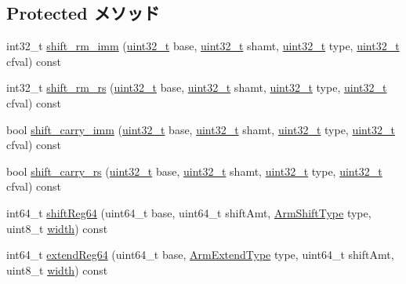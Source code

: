 \subsection*{Protected メソッド}
\begin{DoxyCompactItemize}
\item 
int32\_\-t \hyperlink{classArmISA_1_1ArmStaticInst_a3bf2cda24ceeea2d93bb03f88ddeec19}{shift\_\-rm\_\-imm} (\hyperlink{Type_8hh_a435d1572bf3f880d55459d9805097f62}{uint32\_\-t} base, \hyperlink{Type_8hh_a435d1572bf3f880d55459d9805097f62}{uint32\_\-t} shamt, \hyperlink{Type_8hh_a435d1572bf3f880d55459d9805097f62}{uint32\_\-t} type, \hyperlink{Type_8hh_a435d1572bf3f880d55459d9805097f62}{uint32\_\-t} cfval) const 
\item 
int32\_\-t \hyperlink{classArmISA_1_1ArmStaticInst_a9c90a343b88f159bcb263bd2457848a5}{shift\_\-rm\_\-rs} (\hyperlink{Type_8hh_a435d1572bf3f880d55459d9805097f62}{uint32\_\-t} base, \hyperlink{Type_8hh_a435d1572bf3f880d55459d9805097f62}{uint32\_\-t} shamt, \hyperlink{Type_8hh_a435d1572bf3f880d55459d9805097f62}{uint32\_\-t} type, \hyperlink{Type_8hh_a435d1572bf3f880d55459d9805097f62}{uint32\_\-t} cfval) const 
\item 
bool \hyperlink{classArmISA_1_1ArmStaticInst_a0d5e73a81869e11788298814fcdbc6d5}{shift\_\-carry\_\-imm} (\hyperlink{Type_8hh_a435d1572bf3f880d55459d9805097f62}{uint32\_\-t} base, \hyperlink{Type_8hh_a435d1572bf3f880d55459d9805097f62}{uint32\_\-t} shamt, \hyperlink{Type_8hh_a435d1572bf3f880d55459d9805097f62}{uint32\_\-t} type, \hyperlink{Type_8hh_a435d1572bf3f880d55459d9805097f62}{uint32\_\-t} cfval) const 
\item 
bool \hyperlink{classArmISA_1_1ArmStaticInst_a75fefade18d7fe86d23af0c7944eab6b}{shift\_\-carry\_\-rs} (\hyperlink{Type_8hh_a435d1572bf3f880d55459d9805097f62}{uint32\_\-t} base, \hyperlink{Type_8hh_a435d1572bf3f880d55459d9805097f62}{uint32\_\-t} shamt, \hyperlink{Type_8hh_a435d1572bf3f880d55459d9805097f62}{uint32\_\-t} type, \hyperlink{Type_8hh_a435d1572bf3f880d55459d9805097f62}{uint32\_\-t} cfval) const 
\item 
int64\_\-t \hyperlink{classArmISA_1_1ArmStaticInst_ab15bd99705b24d9b8d647aba628ee562}{shiftReg64} (uint64\_\-t base, uint64\_\-t shiftAmt, \hyperlink{namespaceArmISA_a209d79feaaef0aa2f54ae62e53ee90de}{ArmShiftType} type, uint8\_\-t \hyperlink{namespaceArmISA_a0da89c280130b84ae26405a901396428}{width}) const 
\item 
int64\_\-t \hyperlink{classArmISA_1_1ArmStaticInst_a1a939bcc6d227f5720f0069eabf42516}{extendReg64} (uint64\_\-t base, \hyperlink{namespaceArmISA_a4420842b5673543552a3aba317c69dbb}{ArmExtendType} type, uint64\_\-t shiftAmt, uint8\_\-t \hyperlink{namespaceArmISA_a0da89c280130b84ae26405a901396428}{width}) const 

\end{DoxyCompactItemize}
